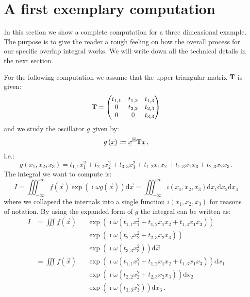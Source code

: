 \documentclass[a4paper,10pt]{article}
\begin{document}
\section{A first exemplary computation}
\label{sec:mv_triag_plain}


In this section we show a complete computation for a three
dimensional example. The purpose is to give the reader a
rough feeling on how the overall process for our specific
overlap integral works. We will write down all the technical
details in the next section.

For the following computation we assume that
the upper triangular matrix $\mathbf{T}$ is given:
\begin{equation}
 \mathbf{T} =
 \begin{pmatrix}
  t_{1,1} & t_{1,2} & t_{1,3} \\
  0       & t_{2,2} & t_{2,3} \\
  0       & 0       & t_{3,3}
 \end{pmatrix}
\end{equation}
and we study the oscillator $g$ given by:
\begin{equation}
 g\left(\underline{x}\right) := \underline{x}{}^{\textnormal{H}} \mathbf{T} \underline{x} \,,
\end{equation}
i.e.:
\begin{equation}
 g\left(x_1, x_2, x_3\right) = t_{1,1} x_1^2 + t_{2,2} x_2^2 + t_{3,3} x_3^2
                             + t_{1,2} x_1 x_2 + t_{1,3} x_1 x_3 + t_{2,3} x_2 x_3 \,.
\end{equation}
The integral we want to compute is:
\begin{equation} \label{eq:mv_original_integral}
  I = \iiint_{-\infty}^{\infty} f\left(\vec{x}\right) \exp\left(\imath \omega g\left(\vec{x}\right) \right) \mathrm{d}\vec{x}
    = \iiint_{-\infty}^{\infty} i\left(x_1, x_2, x_3\right) \mathrm{d}x_1 \mathrm{d}x_2 \mathrm{d}x_3
\end{equation}
where we collapsed the internals into a single function $i\left(x_1, x_2, x_3\right)$
for reasons of notation. By using the expanded form of $g$ the integral can be written as:
\begin{equation}
\begin{alignedat}{2}
 I & = \iiint f\left(\vec{x}\right)
             & & \exp\left(\imath \omega \left(t_{1,1} x_1^2 + t_{1,2} x_1 x_2 + t_{1,3} x_1 x_3\right) \right) \\
             & & & \exp\left(\imath \omega \left(t_{2,2} x_2^2 + t_{2,3} x_2 x_3\right) \right) \\
             & & & \exp\left(\imath \omega \left(t_{3,3} x_3^2 \right) \right)
       \mathrm{d}\vec{x} \\
   & = \iiint f\left(\vec{x}\right)
             & & \exp\left(\imath \omega \left(t_{1,1} x_1^2 + t_{1,2} x_1 x_2 + t_{1,3} x_1 x_3\right) \right)
            \mathrm{d}x_1 \\
             & & & \exp\left(\imath \omega \left(t_{2,2} x_2^2 + t_{2,3} x_2 x_3\right) \right)
            \mathrm{d}x_2 \\
             & & & \exp\left(\imath \omega \left(t_{3,3} x_3^2 \right) \right)
            \mathrm{d}x_3 \,.
\end{alignedat}
\end{equation}
\end{document}
